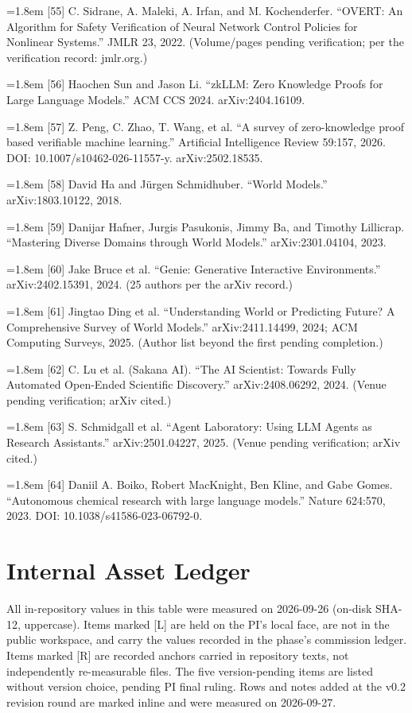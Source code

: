\documentclass[11pt]{article}
\begin{document}
\noindent\hangindent=1.8em [55] C. Sidrane, A. Maleki, A. Irfan, and M. Kochenderfer. ``OVERT: An Algorithm for Safety Verification of Neural Network Control Policies for Nonlinear Systems.'' JMLR 23, 2022. (Volume/pages pending verification; per the verification record: jmlr.org.)\par\medskip
\noindent\hangindent=1.8em [56] Haochen Sun and Jason Li. ``zkLLM: Zero Knowledge Proofs for Large Language Models.'' ACM CCS 2024. arXiv:2404.16109.\par\medskip
\noindent\hangindent=1.8em [57] Z. Peng, C. Zhao, T. Wang, et al. ``A survey of zero-knowledge proof based verifiable machine learning.'' Artificial Intelligence Review 59:157, 2026. DOI: 10.1007/s10462-026-11557-y. arXiv:2502.18535.\par\medskip
\noindent\hangindent=1.8em [58] David Ha and Jürgen Schmidhuber. ``World Models.'' arXiv:1803.10122, 2018.\par\medskip
\noindent\hangindent=1.8em [59] Danijar Hafner, Jurgis Pasukonis, Jimmy Ba, and Timothy Lillicrap. ``Mastering Diverse Domains through World Models.'' arXiv:2301.04104, 2023.\par\medskip
\noindent\hangindent=1.8em [60] Jake Bruce et al. ``Genie: Generative Interactive Environments.'' arXiv:2402.15391, 2024. (25 authors per the arXiv record.)\par\medskip
\noindent\hangindent=1.8em [61] Jingtao Ding et al. ``Understanding World or Predicting Future? A Comprehensive Survey of World Models.'' arXiv:2411.14499, 2024; ACM Computing Surveys, 2025. (Author list beyond the first pending completion.)\par\medskip
\noindent\hangindent=1.8em [62] C. Lu et al. (Sakana AI). ``The AI Scientist: Towards Fully Automated Open-Ended Scientific Discovery.'' arXiv:2408.06292, 2024. (Venue pending verification; arXiv cited.)\par\medskip
\noindent\hangindent=1.8em [63] S. Schmidgall et al. ``Agent Laboratory: Using LLM Agents as Research Assistants.'' arXiv:2501.04227, 2025. (Venue pending verification; arXiv cited.)\par\medskip
\noindent\hangindent=1.8em [64] Daniil A. Boiko, Robert MacKnight, Ben Kline, and Gabe Gomes. ``Autonomous chemical research with large language models.'' Nature 624:570, 2023. DOI: 10.1038/s41586-023-06792-0.\par\medskip
\appendix
\section{Internal Asset Ledger}
\noindent All in-repository values in this table were measured on 2026-09-26 (on-disk SHA-12, uppercase). Items marked [L] are held on the PI's local face, are not in the public workspace, and carry the values recorded in the phase's commission ledger. Items marked [R] are recorded anchors carried in repository texts, not independently re-measurable files. The five version-pending items are listed without version choice, pending PI final ruling. Rows and notes added at the v0.2 revision round are marked inline and were measured on 2026-09-27.\par
\end{document}
